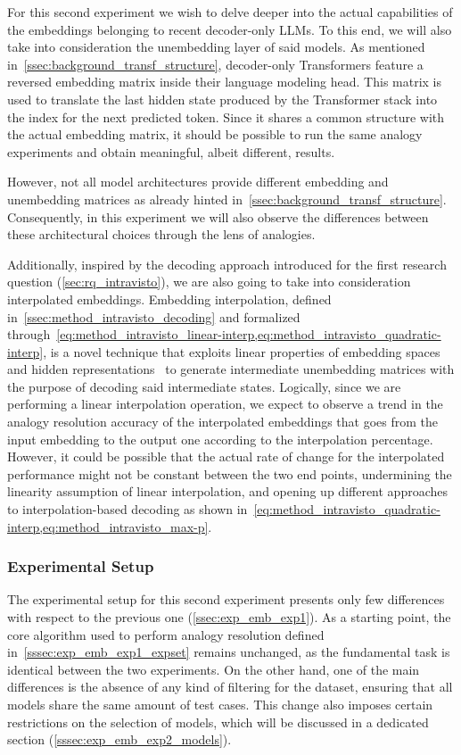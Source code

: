 For this second experiment we wish to delve deeper into the actual capabilities of the embeddings belonging to recent decoder-only LLMs.
To this end, we will also take into consideration the unembedding layer of said models.
As mentioned in~\cref{ssec:background_transf_structure}, decoder-only Transformers feature a reversed embedding matrix inside their language modeling head.
This matrix is used to translate the last hidden state produced by the Transformer stack into the index for the next predicted token.
Since it shares a common structure with the actual embedding matrix, it should be possible to run the same analogy experiments and obtain meaningful, albeit different, results.

However, not all model architectures provide different embedding and unembedding matrices as already hinted in~\cref{ssec:background_transf_structure}.
Consequently, in this experiment we will also observe the differences between these architectural choices through the lens of analogies.

Additionally, inspired by the decoding approach introduced for the first research question (\cref{sec:rq_intravisto}), we are also going to take into consideration interpolated embeddings.
Embedding interpolation, defined in~\cref{ssec:method_intravisto_decoding} and formalized through~\cref{eq:method_intravisto_linear-interp,eq:method_intravisto_quadratic-interp}, is a novel technique that exploits linear properties of embedding spaces and hidden representations~\cite{park2023, mikolov2013, drozd2016} to generate intermediate unembedding matrices with the purpose of decoding said intermediate states.
Logically, since we are performing a linear interpolation operation, we expect to observe a trend in the analogy resolution accuracy of the interpolated embeddings that goes from the input embedding to the output one according to the interpolation percentage.
However, it could be possible that the actual rate of change for the interpolated performance might not be constant between the two end points, undermining the linearity assumption of linear interpolation, and opening up different approaches to interpolation-based decoding as shown in~\cref{eq:method_intravisto_quadratic-interp,eq:method_intravisto_max-p}.

\subsubsection{Experimental Setup}

The experimental setup for this second experiment presents only few differences with respect to the previous one (\cref{ssec:exp_emb_exp1}).
As a starting point, the core algorithm used to perform analogy resolution defined in~\cref{sssec:exp_emb_exp1_expset} remains unchanged, as the fundamental task is identical between the two experiments.
On the other hand, one of the main differences is the absence of any kind of filtering for the dataset, ensuring that all models share the same amount of test cases.
This change also imposes certain restrictions on the selection of models, which will be discussed in a dedicated section (\cref{sssec:exp_emb_exp2_models}).

